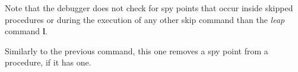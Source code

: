 \begin{descr}{1cm}
Note that the debugger does not check for spy points that occur inside
skipped procedures or during the execution of any other skip command
than the {\it leap} command {\bf l}.

Similarly to the previous command, this one removes a spy point
from a procedure, if it has one.


%
%
%

\end{descr}

